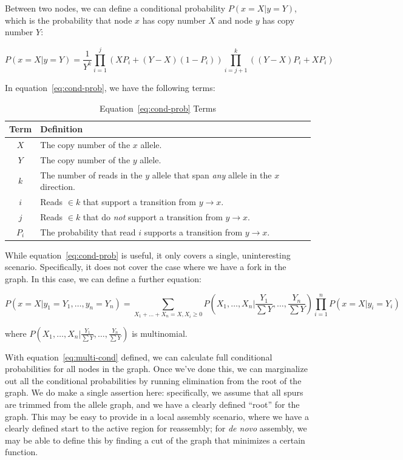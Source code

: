 \documentclass[masters]{ucbthesis}
\begin{document}
Between two nodes, we can define a conditional probability $P(x = X | y = Y)$, which is the probability that
node $x$ has copy number $X$ and node $y$ has copy number $Y$:

\begin{equation}
\label{eq:cond-prob}
P(x = X | y = Y) = \frac{1}{Y^k}\prod_{i = 1}^{j} ( X P_i + (Y - X) (1 - P_i)) \prod_{i = j + 1}^{k} ((Y - X) P_i + X P_i )
\end{equation}

In equation~\eqref{eq:cond-prob}, we have the following terms:

\begin{table}[h]
\begin{center}
\caption{Equation~\eqref{eq:cond-prob} Terms}
\label{tab:cond-prob-terms}
\begin{tabular}{| c | l |}
\hline
Term & Definition \\
\hline
\hline
$X$ & The copy number of the $x$ allele. \\
$Y$ & The copy number of the $y$ allele. \\
$k$ & The number of reads in the $y$ allele that span \emph{any} allele in the $x$ direction. \\
$i$ & Reads $\in k$ that support a transition from $y \rightarrow x$. \\
$j$ & Reads $\in k$ that do \emph{not} support a transition from $y \rightarrow x$. \\
$P_i$ & The probability that read $i$ supports a transition from $y \rightarrow x$. \\
\hline
\end{tabular}
\end{center}
\end{table}

While equation~\eqref{eq:cond-prob} is useful, it only covers a single, uninteresting scenario. Specifically, it does not cover the case
where we have a fork in the graph. In this case, we can define a further equation:

\begin{equation}
\label{eq:multi-cond}
P(x = X | y_1 = Y_1, \dots, y_n = Y_n) = \sum_{X_1 + \dots + X_n = X, X_i \ge 0} P(X_1, \dots, X_n | \frac{Y_1}{\sum Y}, \dots, \frac{Y_n}{\sum Y}) \prod_{i = 1}^{n} P(x = X | y_i = Y_i)
\end{equation}

where $P(X_1, \dots, X_n | \frac{Y_1}{\sum Y}, \dots, \frac{Y_n}{\sum Y})$ is multinomial.

With equation~\eqref{eq:multi-cond} defined, we can calculate full conditional probabilities for all nodes in the graph. Once we've done
this, we can marginalize out all the conditional probabilities by running elimination from the root of the graph. We do make a single
assertion here: specifically, we assume that all spurs are trimmed from the allele graph, and we have a clearly defined ``root'' for the
graph. This may be easy to provide in a local assembly scenario, where we have a clearly defined start to the active region for
reassembly; for \emph{de novo} assembly, we may be able to define this by finding a cut of the graph that minimizes a certain function.
\end{document}
